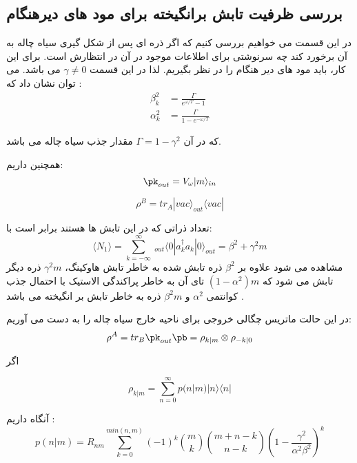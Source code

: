 \subsection{بررسی ظرفیت تابش برانگیخته برای مود های دیرهنگام} %

در این قسمت می خواهیم بررسی کنیم که اگر ذره ای پس از شکل گیری سیاه چاله به آن برخورد کند چه سرنوشتی برای اطلاعات موجود در آن در انتظارش است. برای این کار، باید مود های دیر هنگام را در نظر بگیریم. لذا در این قسمت
$\gamma \neq 0$
می باشد. می توان نشان داد
\cite{cit}
که :
\begin{align}
	\beta_k^2 &= \frac{\Gamma}{e^{\omega / T} - 1} \\
	\alpha_k^2 &= \frac{\Gamma}{1- e^{-\omega / T}}
\end{align}

که در آن 
$\Gamma = 1 - \gamma ^2$
مقدار جذب 
سیاه چاله می باشد.

همچنین داریم:
\begin{equation}
	\pk_{out} = V_\omega |m\rangle_{in}
\end{equation}


\begin{equation} \label{rhoic}
\rho^B = tr_{A} |vac\rangle_{out} \langle vac |
\end{equation}

تعداد ذراتی که در این تابش ها هستند برابر است با:
 \begin{equation}
 \langle N_1 \rangle = \sum_{k=-\infty}^{\infty} \ _{out} \langle 0 |a_k^\dagger a_k |0\rangle _{out} =  \beta^2 + \gamma^2 m
 \end{equation}
مشاهده می شود علاوه بر 
$\beta^2$
ذره تابش شده به خاطر تابش هاوکینگ، 
$\gamma^2 m$
ذره دیگر تابش می شود که 
$(1-\alpha^2)m$
تای آن به خاطر پراکندگی الاستیک با احتمال جذب کوانتمی 
$\alpha^2$
و 
$\beta^2 m $
ذره به خاطر تابش بر انگیخته می باشد
\cite{cit}
.

در این حالت ماتریس چگالی خروجی برای ناحیه خارج سیاه چاله را به دست می آوریم:
\begin{equation}
\rho^A = tr_B \pk_{out} \pb = \rho_{k|m} \otimes \rho_{-k|0}
\end{equation}

اگر

\begin{equation}
\rho_{k|m} = \sum_{n=0}^{\infty} p(n|m) |n\rangle \langle n|
\end{equation}

آنگاه داریم
\cite{cit}
:
\begin{equation}
p(n|m) = R_{nm} \sum_{k=0}^{min(n,m)} (-1)^k \binom{m}{k} \binom{m+n-k}{n-k} (1-\frac{\gamma^2}{\alpha^2 \beta^2})^k
\end{equation}

